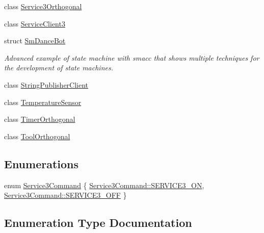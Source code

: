 \begin{DoxyCompactItemize}
class \hyperlink{classsm__dance__bot_1_1Service3Orthogonal}{Service3\+Orthogonal}
\item 
class \hyperlink{classsm__dance__bot_1_1ServiceClient3}{Service\+Client3}
\item 
struct \hyperlink{structsm__dance__bot_1_1SmDanceBot}{Sm\+Dance\+Bot}
\begin{DoxyCompactList}\small\item\em Advanced example of state machine with smacc that shows multiple techniques for the development of state machines. \end{DoxyCompactList}\item 
class \hyperlink{classsm__dance__bot_1_1StringPublisherClient}{String\+Publisher\+Client}
\item 
class \hyperlink{classsm__dance__bot_1_1TemperatureSensor}{Temperature\+Sensor}
\item 
class \hyperlink{classsm__dance__bot_1_1TimerOrthogonal}{Timer\+Orthogonal}
\item 
class \hyperlink{classsm__dance__bot_1_1ToolOrthogonal}{Tool\+Orthogonal}
\end{DoxyCompactItemize}
\subsection*{Enumerations}
\begin{DoxyCompactItemize}
\item 
enum \hyperlink{namespacesm__dance__bot_a2d0902aa29698165effd2c3248a9c8ff}{Service3\+Command} \{ \hyperlink{namespacesm__dance__bot_a2d0902aa29698165effd2c3248a9c8ffa13cdca48a01bbb44fa8fb35567fbc58e}{Service3\+Command\+::\+S\+E\+R\+V\+I\+C\+E3\+\_\+\+ON}, 
\hyperlink{namespacesm__dance__bot_a2d0902aa29698165effd2c3248a9c8ffa642ed22a7f6b816840289b4256116e9e}{Service3\+Command\+::\+S\+E\+R\+V\+I\+C\+E3\+\_\+\+O\+FF}
 \}
\end{DoxyCompactItemize}


\subsection{Enumeration Type Documentation}
